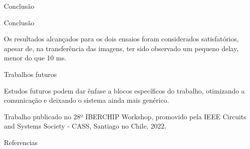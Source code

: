 \documentclass[10pt]{beamer}
\begin{document}
\begin{frame}{Conclusão}
	\begin{alertblock}{Conclusão}
		\vspace{0.1cm}
		\begin{justify}
			Os resultados alcançados para os dois ensaios foram considerados satisfatórios, apesar de, na transferência das imagens, ter sido observado um pequeno delay, menor do que 10 ms.
		\end{justify}
	\end{alertblock}
	\begin{alertblock}{Trabalhos futuros}
		\vspace{0.1cm}
	    \begin{justify}
			Estudos futuros podem dar ênfase a blocos específicos do trabalho, otimizando a comunicação e deixando o sistema ainda mais genérico.
	    \end{justify}
	\end{alertblock}
	\vspace{0.4cm}
	{\small Trabalho publicado no 28º IBERCHIP Workshop, promovido pela IEEE Circuits and Systems Society - CASS, Santiago no Chile, 2022.}
\end{frame}






\begin{frame}[allowframebreaks]{Referencias}
  
  
\end{frame}
\end{document}

